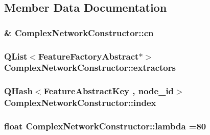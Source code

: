 \subsection{Member Data Documentation}
\hypertarget{class_complex_network_constructor_aa099456a58edc5c1885323061206b3e6}{
\subsubsection[{cn}]{\& Complex\+Network\+Constructor\+::cn\hspace{0.3cm}{\ttfamily [private]}}}\label{class_complex_network_constructor_aa099456a58edc5c1885323061206b3e6}
\hypertarget{class_complex_network_constructor_ae79b538a8b9253cd71de5fef1be1c18a}{
\subsubsection[{extractors}]{\setlength{\rightskip}{0pt plus 5cm}Q\+List$<${\bf Feature\+Factory\+Abstract}$\ast$$>$ Complex\+Network\+Constructor\+::extractors\hspace{0.3cm}{\ttfamily [private]}}}\label{class_complex_network_constructor_ae79b538a8b9253cd71de5fef1be1c18a}
\hypertarget{class_complex_network_constructor_ad616573ee07edff462c552d3fc2bfce7}{
\subsubsection[{index}]{\setlength{\rightskip}{0pt plus 5cm}Q\+Hash$<${\bf Feature\+Abstract\+Key} , {\bf node\+\_\+id}$>$ Complex\+Network\+Constructor\+::index\hspace{0.3cm}{\ttfamily [private]}}}\label{class_complex_network_constructor_ad616573ee07edff462c552d3fc2bfce7}
\hypertarget{class_complex_network_constructor_a9d3e346719dc1f8f3093a48b8d44e669}{
\subsubsection[{lambda}]{\setlength{\rightskip}{0pt plus 5cm}float Complex\+Network\+Constructor\+::lambda =80\hspace{0.3cm}{\ttfamily [private]}}}\label{class_complex_network_constructor_a9d3e346719dc1f8f3093a48b8d44e669}
